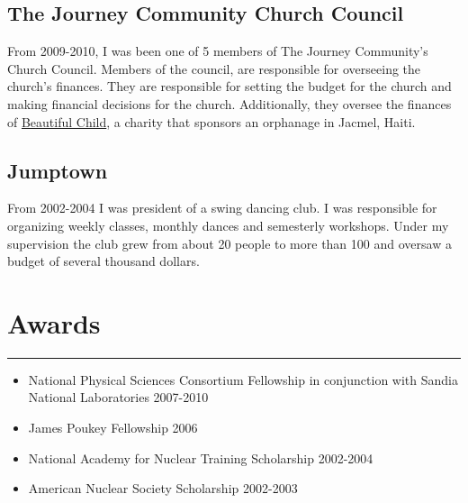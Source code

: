 \documentclass[letterpaper,11pt]{article}
\begin{document}
\subsection*{The Journey Community Church Council}
From 2009-2010, I was been one of 5 members of The Journey Community's Church
Council.  Members of the council, are responsible for overseeing the church's
finances.  They are responsible for setting the  budget for the church and
making financial decisions for the church.  Additionally, they oversee the
finances of \href{http://www.beautifulchild.org}{Beautiful Child}, a charity
that sponsors an orphanage in Jacmel, Haiti.

\subsection*{Jumptown}
From 2002-2004 I was president of a swing dancing club.  I was responsible for
organizing weekly classes, monthly dances and semesterly workshops.  Under my
supervision the club grew from about 20 people to more than 100 and oversaw a
budget of several thousand dollars.

\section*{Awards}
\hrule
\vspace{0.05in}
\begin{itemize}
	\item National Physical Sciences Consortium Fellowship in conjunction with Sandia National Laboratories 2007-2010
	\item James Poukey Fellowship 2006
	\item National Academy for Nuclear Training Scholarship 2002-2004
	\item American Nuclear Society Scholarship 2002-2003
\end{itemize}

\bigskip
\end{document}

